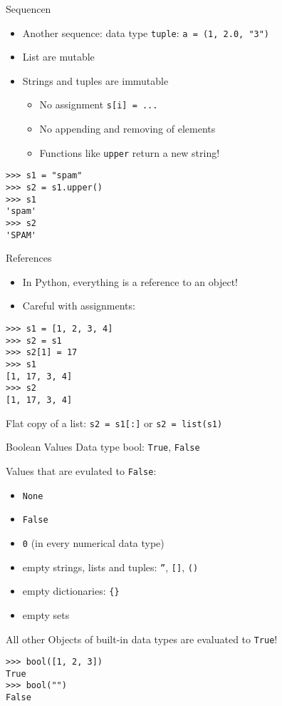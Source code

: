\begin{frame}[fragile]{Sequencen}
\begin{itemize}
\item Another sequence: data type \alert{\texttt{tuple}}: \lstinline{a = (1, 2.0, "3")}
\item List are mutable
\item Strings and tuples are immutable
\begin{itemize}
\item No assignment \lstinline{s[i] = ...}
\item No appending and removing of elements
\item Functions like \texttt{upper} return a new string!
\end{itemize}
\end{itemize}
\begin{lstlisting}[style=Shell]
>>> s1 = "spam"
>>> s2 = s1.upper()
>>> s1
'spam'
>>> s2
'SPAM'
\end{lstlisting}
\end{frame}

\begin{frame}[fragile]{References}
\begin{itemize}
\item In Python, everything is a reference to an object!
\item Careful with assignments:
\end{itemize}
\begin{lstlisting}[style=Shell]
>>> s1 = [1, 2, 3, 4]
>>> s2 = s1
>>> s2[1] = 17
>>> s1
[1, 17, 3, 4]
>>> s2
[1, 17, 3, 4]
\end{lstlisting}
Flat copy of a list: \lstinline{s2 = s1[:]} or \lstinline{s2 = list(s1)}
\end{frame}

\begin{frame}[fragile]{Boolean Values}
Data type \alert{bool}: \texttt{True}, \texttt{False}

Values that are evulated to \texttt{False}:
\begin{itemize}
\item \texttt{None}
\item \texttt{False}
\item \texttt{0} (in every numerical data type)
\item empty strings, lists and tuples: \texttt{''}, \texttt{[]}, \texttt{()}
\item empty dictionaries: \texttt{\{\}}
\item empty sets
\end{itemize}
All other Objects of built-in data types are evaluated to \texttt{True}!
\begin{lstlisting}[style=Shell]
>>> bool([1, 2, 3])
True
>>> bool("")
False
\end{lstlisting}
\end{frame}

